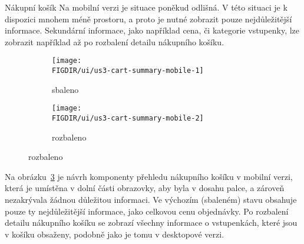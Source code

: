 \begin{subsection}{Nákupní košík}
    \pagebreak
    Na mobilní verzi je situace poněkud odlišná.
    V této situaci je k dispozici mnohem méně prostoru, a proto je nutné zobrazit pouze nejdůležitější informace.
    Sekundární informace, jako například cena, či kategorie vstupenky, lze zobrazit například až po rozbalení detailu nákupního košíku.

    \begin{figure}[H]
        \centering
        \caption{Návrh komponent přehledu nákupního košíku (mobilní verze)}
        \begin{subfigure}{0.4\textwidth}
            \texttt{[image: \\FIGDIR/ui/us3-cart-summary-mobile-1]}
            \caption{sbaleno}
            \label{fig:us3-cart-summary-mobile-1}
        \end{subfigure}
        \hfill
        \begin{subfigure}{0.4\textwidth}
            \texttt{[image: \\FIGDIR/ui/us3-cart-summary-mobile-2]}
            \caption{rozbaleno}
            \label{fig:us3-cart-summary-mobile-2}
        \end{subfigure}
        \source{}
        \label{fig:us3-cart-summary-mobile}
    \end{figure}

    Na obrázku~\ref{fig:us3-cart-summary-mobile} je návrh komponenty přehledu nákupního košíku v mobilní verzi, která je umístěna v dolní části obrazovky, aby byla v dosahu palce, a zároveň nezakrývala žádnou důležitou informaci.
    Ve výchozím (sbaleném) stavu obsahuje pouze ty nejdůležitější informace, jako celkovou cenu objednávky.
    Po rozbalení detailu nákupního košíku se zobrazí všechny informace o vstupenkách, které jsou v košíku obsaženy, podobně jako je tomu v desktopové verzi.
\end{subsection}

